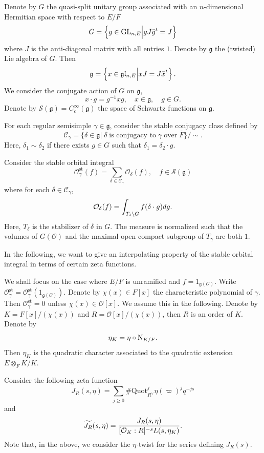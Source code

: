 \documentclass[a4paper]{amsart}
\newcommand{\CC}{{\mathcal {C}}} \renewcommand{\CD}{{\mathcal {D}}}
\newcommand{\CO}{{\mathcal {O}}} \newcommand{\CP}{{\mathcal {P}}}
\newcommand{\CS}{{\mathcal {S}}} \newcommand{\CT}{{\mathcal {T}}}
\newcommand{\fg}{{\mathfrak{g}}} \newcommand{\fh}{{\mathfrak{h}}}
\newcommand{\st}{{\mathrm{st}}}\newcommand{\supp}{{\mathrm{supp}}}
\theoremstyle{plain}
\theoremstyle{remark} \newtheorem{remark}[thm]{Remark}
\theoremstyle{exercise} \newtheorem{exercise}[thm]{Exercise}
\theoremstyle{example} \newtheorem{example}[thm]{Example}
\theoremstyle{question} \newtheorem{question}[thm]{Question}
\theoremstyle{assumption} \newtheorem{assumption}[thm]{Assumption}
\numberwithin{equation}{section}
\newcommand{\Quot}{{\mathrm{Quot}}}
\begin{document}
Denote by $G$ the quasi-split unitary group associated with an $n$-dimensional
Hermitian space with respect to $E/F$
\[G = \left\{ g \in {\mathrm{GL}}_{n,E} \Big| gJ\bar{g}^t = J \right\}\]
where $J$ is the  anti-diagonal matrix with all entries $1$. Denote by $\fg$ the (twisted) Lie algebra of $G$. Then 
\[\fg = \left\{ x \in \fg\fl_{n,E} \Big| xJ= J\bar{x}^t  \right\}.\]
We consider the conjugate action of $G$ on $\fg$,
\[x \cdot g = g^{-1} x g, \quad x \in \fg, \quad g \in G.\] 
Denote by $\CS(\fg) = C_c^\infty(\fg)$ the space of Schwartz
functions on $\fg$.

For each regular semisimple $\gamma \in \fg$, consider the stable conjugacy class defined by 
$$\CC_{\gamma}=\{\delta\in \fg|\;\delta\; \text{is conjugacy to}\; \gamma \;\text{over}\; \bar F\}/\sim.$$
Here, $\delta_1\sim\delta_2$ if there exists $g\in G$ such that $\delta_1= \delta_2 \cdot g$.

Consider the stable orbital integral
\[\CO_\gamma^\st(f) = \sum_{\delta \in\mathcal C_ \gamma} \CO_{\delta}(f), \quad f \in \CS(\fg)\]
where for each $\delta \in \CC_\gamma$,
\[\CO_{\delta}(f) = \int_{T_\delta \bs G} f(\delta \cdot g)dg.\]
Here, $T_\delta$ is the stabilizer of $\delta$ in $G$. The
measure is normalized such that the volumes of $G(\CO)$  and the
maximal open compact subgroup of $T_{\gamma}$ are both $1$. 

In the following, we want to give an interpolating property of the stable orbital integral in terms of certain zeta functions.


We shall focus on the case where $E/F$ is unramified and $f = 1_{\fg(\CO)}$. Write $\CO_\gamma^\st = \CO_\gamma^\st(1_{\fg(\CO)})$. 
Denote by $\chi(x) \in F[x]$ the characteristic polynomial of $\gamma$.  Then $\CO_\gamma^\st = 0$ unless $\chi(x) \in \CO[x]$. We assume 
this in the following. Denote by $K = F[x]/(\chi(x))$ and $R = \CO[x]/(\chi(x))$, then $R$ is an order of $K$. Denote by 
\[\eta_K = \eta \circ {\mathrm {N}}_{K/F}.\]
Then $\eta_K$ is the quadratic character associated to the quadratic extension $E \otimes_F K / K$.


Consider the following zeta function
\[J_R(s,\eta) = \sum_{j \geq 0} \# \Quot_{R^\vee}^j \eta(\varpi)^j q^{-js}\]
and
\[\wt{J_R}(s,\eta) = \frac{J_R(s,\eta)}{[\CO_K:R]^{-s} L(s,\eta_K)}.\]
Note that, in the above, we consider the $\eta$-twist for the series defining $J_R(s)$.
\end{document}
